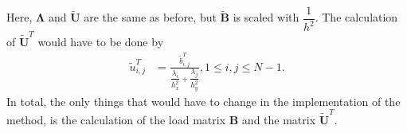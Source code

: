 Here, $\mathbf{\Lambda}$ and $\mathbf{\widetilde{U}}$ are the same as before, but $\mathbf{\widetilde{B}}$ is scaled with $\dfrac{1}{h^2}$. The calculation of $\mathbf{\widetilde{U}}^T$ would have to be done by
\begin{align*}
	\tilde{u}^T_{i,j} &= \frac{\tilde{b}^T_{i,j}}{\dfrac{\lambda_i}{h_x^2} + \dfrac{\lambda_j}{h_y^2}}, 1 \leq i, j \leq N-1.
\end{align*}
In total, the only things that would have to change in the implementation of the method, is the calculation of the load matrix $\mathbf{B}$ and the matrix $\mathbf{\widetilde{U}}^T$.
